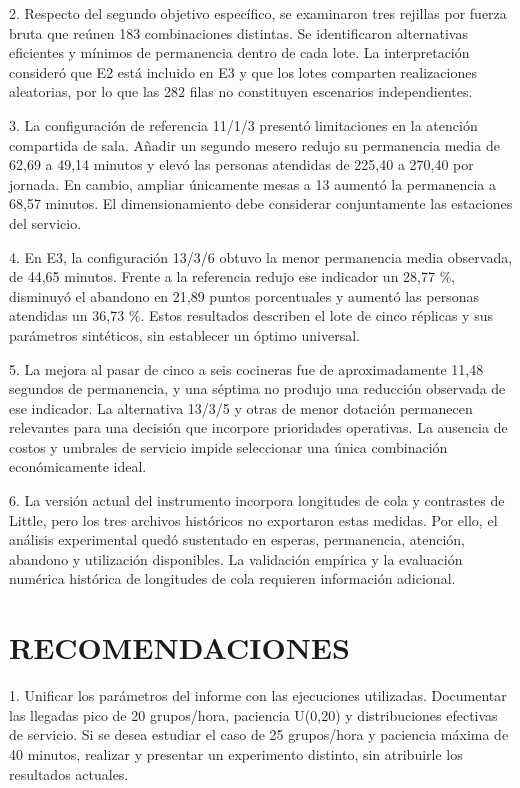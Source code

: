 \documentclass[10pt,a4paper,twocolumn]{article}
\begin{document}
2. Respecto del segundo objetivo específico, se examinaron tres rejillas por fuerza bruta que reúnen 183 combinaciones distintas. Se identificaron alternativas eficientes y mínimos de permanencia dentro de cada lote. La interpretación consideró que E2 está incluido en E3 y que los lotes comparten realizaciones aleatorias, por lo que las 282 filas no constituyen escenarios independientes.

3. La configuración de referencia 11/1/3 presentó limitaciones en la atención compartida de sala. Añadir un segundo mesero redujo su permanencia media de 62,69 a 49,14 minutos y elevó las personas atendidas de 225,40 a 270,40 por jornada. En cambio, ampliar únicamente mesas a 13 aumentó la permanencia a 68,57 minutos. El dimensionamiento debe considerar conjuntamente las estaciones del servicio.

4. En E3, la configuración 13/3/6 obtuvo la menor permanencia media observada, de 44,65 minutos. Frente a la referencia redujo ese indicador un 28,77 \%, disminuyó el abandono en 21,89 puntos porcentuales y aumentó las personas atendidas un 36,73 \%. Estos resultados describen el lote de cinco réplicas y sus parámetros sintéticos, sin establecer un óptimo universal.

5. La mejora al pasar de cinco a seis cocineras fue de aproximadamente 11,48 segundos de permanencia, y una séptima no produjo una reducción observada de ese indicador. La alternativa 13/3/5 y otras de menor dotación permanecen relevantes para una decisión que incorpore prioridades operativas. La ausencia de costos y umbrales de servicio impide seleccionar una única combinación económicamente ideal.

6. La versión actual del instrumento incorpora longitudes de cola y contrastes de Little, pero los tres archivos históricos no exportaron estas medidas. Por ello, el análisis experimental quedó sustentado en esperas, permanencia, atención, abandono y utilización disponibles. La validación empírica y la evaluación numérica histórica de longitudes de cola requieren información adicional.

\section{RECOMENDACIONES}

1. Unificar los parámetros del informe con las ejecuciones utilizadas. Documentar las llegadas pico de 20 grupos/hora, paciencia U(0,20) y distribuciones efectivas de servicio. Si se desea estudiar el caso de 25 grupos/hora y paciencia máxima de 40 minutos, realizar y presentar un experimento distinto, sin atribuirle los resultados actuales.
\end{document}
